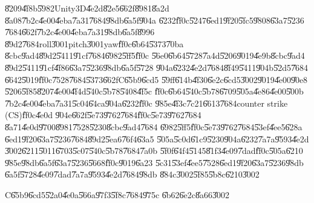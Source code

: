 \U{8209}\U{4f8b}\U{5982}Unity3D\U{4e2d}\U{82e5}\U{662f}\U{8981}\U{8a2d}%
\U{8a08}\U{7b2c}\U{4e00}\U{4eba}\U{7a31}\U{7684}\U{98db}\U{6a5f}\U{904a}%
\U{6232}\U{ff0c}\U{5247}\U{6ed1}\U{9f20}\U{5fc5}\U{9808}\U{63a7}\U{5236}%
\U{7684}\U{662f}\U{7b2c}\U{4e00}\U{4eba}\U{7a31}\U{98db}\U{6a5f}\U{8996}%
\U{89d2}\U{7684}roll\U{3001}pitch\U{3001}yaw\U{ff0c}\U{6b64}\U{5373}\U{70ba}%
\U{8cbc}\U{9ad4}\U{89d2}\U{5411}\U{91cf}\U{7684}\U{6982}\U{5ff5}\U{ff0c}%
\U{56e0}\U{6b64}\U{5728}\U{7a4d}\U{5206}\U{9019}\U{4e9b}\U{8cbc}\U{9ad4}%
\U{89d2}\U{5411}\U{91cf}\U{4f86}\U{63a7}\U{5236}\U{98db}\U{6a5f}\U{5728}%
\U{904a}\U{6232}\U{4e2d}\U{7684}\U{8f49}\U{5411}\U{904b}\U{52d5}\U{7684}%
\U{6642}\U{5019}\U{ff0c}\U{7528}\U{7684}\U{5373}\U{662f}C\U{65b9}\U{6cd5}%
\U{59ff}\U{614b}\U{4f30}\U{6e2c}\U{6cd5}\U{3002}\U{9019}\U{4e00}\U{90e8}%
\U{5206}\U{5f85}\U{8207}\U{4e00}\U{4f4d}\U{540c}\U{5b78}\U{5408}\U{4f5c}%
\U{ff0c}\U{6b64}\U{540c}\U{5b78}\U{6709}\U{505a}\U{4e86}\U{4e00}\U{500b}%
\U{7b2c}\U{4e00}\U{4eba}\U{7a31}\U{5c04}\U{64ca}\U{904a}\U{6232}\U{ff0c}%
\U{985e}\U{4f3c}\U{7c21}\U{6613}\U{7684}counter strike (CS)\U{ff0c}\U{4e0d}%
\U{904e}\U{662f}\U{5e73}\U{9762}\U{7684}\U{ff0c}\U{5e73}\U{9762}\U{7684}%
\U{8a71}\U{4e0d}\U{9700}\U{8981}\U{7528}\U{5230}\U{8cbc}\U{9ad4}\U{7684}%
\U{6982}\U{5ff5}\U{ff0c}\U{5e73}\U{9762}\U{7684}\U{53ef}\U{4ee5}\U{628a}%
\U{6ed1}\U{9f20}\U{63a7}\U{5236}\U{7684}\U{89d2}\U{5ea6}\U{76f4}\U{63a5}%
\U{505a}\U{5c0d}\U{61c9}\U{5230}\U{904a}\U{6232}\U{7a7a}\U{9593}\U{4e2d}%
\U{3002}\U{6211}\U{5011}\U{6703}\U{5c07}\U{540c}\U{5b78}\U{7684}\U{7a0b}%
\U{5f0f}\U{64f4}\U{5145}\U{81f3}\U{4e09}\U{7dad}\U{ff0c}\U{505a}\U{6210}%
\U{985e}\U{98db}\U{6a5f}\U{63a7}\U{5236}\U{5668}\U{ff0c}\U{9019}\U{6a23}%
\U{5c31}\U{53ef}\U{4ee5}\U{7528}\U{6ed1}\U{9f20}\U{63a7}\U{5236}\U{98db}%
\U{6a5f}\U{5728}\U{4e09}\U{7dad}\U{7a7a}\U{9593}\U{4e2d}\U{7684}\U{98db}%
\U{884c}\U{3002}\U{5f85}\U{5b8c}\U{6210}\U{3002}

\clearpage%

\begin{case}
C\U{65b9}\U{6cd5}\U{52a0}\U{4e0a}\U{566a}\U{97f3}\U{5f8c}\U{7684}\U{975c}%
\U{6b62}\U{6e2c}\U{8a66}\U{3002}
\end{case}

